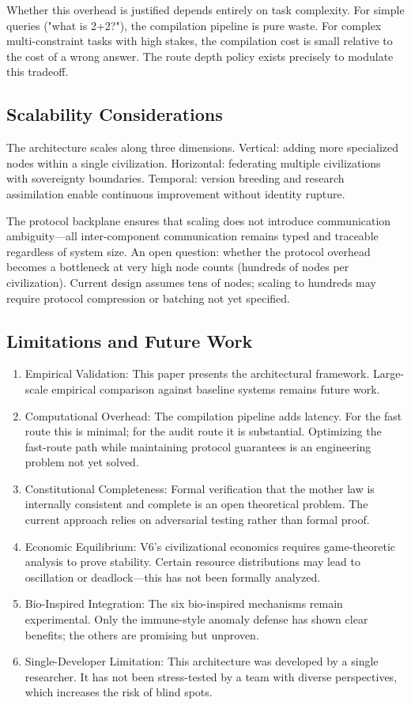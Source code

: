 \documentclass[12pt,a4paper]{article}
\begin{document}
Whether this overhead is justified depends entirely on task complexity. For simple queries ("what is 2+2?"), the compilation pipeline is pure waste. For complex multi-constraint tasks with high stakes, the compilation cost is small relative to the cost of a wrong answer. The route depth policy exists precisely to modulate this tradeoff.

\subsection{Scalability Considerations}


The architecture scales along three dimensions. Vertical: adding more specialized nodes within a single civilization. Horizontal: federating multiple civilizations with sovereignty boundaries. Temporal: version breeding and research assimilation enable continuous improvement without identity rupture.

The protocol backplane ensures that scaling does not introduce communication ambiguity---all inter-component communication remains typed and traceable regardless of system size. An open question: whether the protocol overhead becomes a bottleneck at very high node counts (hundreds of nodes per civilization). Current design assumes tens of nodes; scaling to hundreds may require protocol compression or batching not yet specified.

\subsection{Limitations and Future Work}


\begin{enumerate}
  \item Empirical Validation: This paper presents the architectural framework. Large-scale empirical comparison against baseline systems remains future work.
  \item Computational Overhead: The compilation pipeline adds latency. For the fast route this is minimal; for the audit route it is substantial. Optimizing the fast-route path while maintaining protocol guarantees is an engineering problem not yet solved.
  \item Constitutional Completeness: Formal verification that the mother law is internally consistent and complete is an open theoretical problem. The current approach relies on adversarial testing rather than formal proof.
  \item Economic Equilibrium: V6's civilizational economics requires game-theoretic analysis to prove stability. Certain resource distributions may lead to oscillation or deadlock---this has not been formally analyzed.
  \item Bio-Inspired Integration: The six bio-inspired mechanisms remain experimental. Only the immune-style anomaly defense has shown clear benefits; the others are promising but unproven.
  \item Single-Developer Limitation: This architecture was developed by a single researcher. It has not been stress-tested by a team with diverse perspectives, which increases the risk of blind spots.
\end{enumerate}
\end{document}
